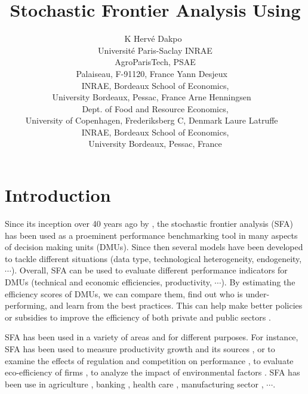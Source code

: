 \documentclass[nojss]{jss}
\author{K Herv\'e Dakpo~\orcidlink{0000-0002-6114-7896}\\Universit\'e 
Paris-Saclay INRAE \\ AgroParisTech, PSAE\\ Palaiseau, F-91120, France \AND
Yann Desjeux ~ \\INRAE, Bordeaux School of Economics, \\ University Bordeaux, 
Pessac, France \AND Arne Henningsen ~ \\ Dept. of Food and Resource Economics,\\ 
University of Copenhagen, Frederiksberg C, Denmark \AND Laure Latruffe ~ \\
INRAE, Bordeaux School of Economics, \\ University Bordeaux, 
Pessac, France}
\title{Stochastic Frontier Analysis Using \pkg{sfaR}}
\begin{document}




\section[Introduction]{Introduction} \label{sec:intro}

Since its inception over 40 years ago by \citet{aig77, mee77, batt77}, the 
stochastic frontier analysis (SFA) has been used as a proeminent performance 
benchmarking tool in many aspects of decision making units (DMUs). Since then 
several models have been developed to tackle different situations (data type, 
technological heterogeneity, endogeneity, $\cdots$). Overall, SFA can be used 
to evaluate different performance indicators for DMUs (technical and economic 
efficiencies, productivity, $\cdots$). By estimating the efficiency scores of 
DMUs, we can compare them, find out who is under-performing, and learn from the 
best practices. This can help make better policies or subsidies to improve the 
efficiency of both private and public sectors \citep{par14}. 

SFA has been used in a variety of areas and for different purposes. For 
instance, SFA has been used to measure productivity growth and its sources 
\citep{orea02}, or to examine the effects of regulation and competition on 
performance \citep{myd20, kang02}, to evaluate eco-efficiency of firms 
\citep{mada23}, to analyze the impact of environmental factors \citep{li19}. 
SFA has been use in agriculture \citep{latruffe23}, banking \citep{badu21}, 
health care \citep{ji20}, manufacturing sector \citep{boy19}, $\cdots$. 
\end{document}
